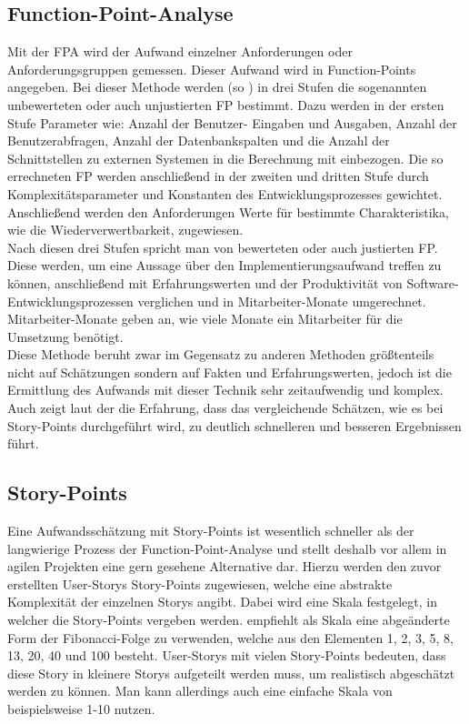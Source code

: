 \subsection{Function-Point-Analyse}
Mit der \ac{FPA} wird der Aufwand einzelner Anforderungen oder Anforderungsgruppen gemessen. Dieser Aufwand wird in Function-Points angegeben. Bei dieser Methode werden (so \cite{Lipinski}) in drei Stufen die sogenannten unbewerteten oder auch unjustierten \ac{FP} bestimmt. Dazu werden in der ersten Stufe Parameter wie: Anzahl der Benutzer- Eingaben und Ausgaben, Anzahl der Benutzerabfragen, Anzahl der Datenbankspalten und die Anzahl der Schnittstellen zu externen Systemen in die Berechnung mit einbezogen. Die so errechneten \ac{FP} werden anschließend in der zweiten und dritten Stufe durch Komplexitätsparameter und Konstanten des Entwicklungsprozesses gewichtet. Anschließend werden den Anforderungen Werte für bestimmte Charakteristika, wie die Wiederverwertbarkeit, zugewiesen. \\

Nach diesen drei Stufen spricht man von bewerteten oder auch justierten \ac{FP}. Diese werden, um eine Aussage über den Implementierungsaufwand treffen zu können, anschließend mit Erfahrungswerten und der Produktivität von Software-Entwicklungsprozessen verglichen und in Mitarbeiter-Monate umgerechnet. Mitarbeiter-Monate geben an, wie viele Monate ein Mitarbeiter für die Umsetzung benötigt.\\

Diese Methode beruht zwar im Gegensatz zu anderen Methoden größtenteils nicht auf Schätzungen sondern auf Fakten und Erfahrungswerten, jedoch ist die Ermittlung des Aufwands mit dieser Technik sehr zeitaufwendig und komplex. Auch zeigt laut der \cite{AGIL1} die Erfahrung, dass das vergleichende Schätzen, wie es bei Story-Points durchgeführt wird, zu deutlich schnelleren und besseren Ergebnissen führt.

\subsection{Story-Points}
Eine Aufwandsschätzung mit Story-Points ist wesentlich schneller als der langwierige Prozess der Function-Point-Analyse und stellt deshalb vor allem in agilen Projekten eine gern gesehene Alternative dar. Hierzu werden den zuvor erstellten User-Storys Story-Points zugewiesen, welche eine abstrakte Komplexität der einzelnen Storys angibt. Dabei wird eine Skala festgelegt, in welcher die Story-Points vergeben werden. \cite{Preuss1} empfiehlt als Skala eine abgeänderte Form der Fibonacci-Folge zu verwenden, welche aus den Elementen 1, 2, 3, 5, 8, 13, 20, 40 und 100 besteht. User-Storys mit vielen Story-Points bedeuten, dass diese Story in kleinere Storys aufgeteilt werden muss, um realistisch abgeschätzt werden zu können. Man kann allerdings auch eine einfache Skala von beispielsweise 1-10 nutzen.\\

